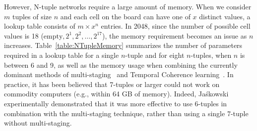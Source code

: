 However, N-tuple networks require a large amount of memory.
When we consider $m$ tuples of size $n$ and each cell on the board can have one of $x$ distinct values, a lookup table consists of $m \times x^n$ entries.
In 2048, since the number of possible cell values is 18 ($\mbox{empty}, 2^1, 2^2, \ldots, 2^{17}$), the memory requirement becomes an issue as $n$ increases.
Table~\ref{table:NTupleMemory} summarizes the number of parameters required in a lookup table for a single $n$-tuple and for eight $n$-tuples, when $n$ is between 6 and 9, as well as the memory usage when combining the currently dominant methods of multi-staging~\cite{YWHC16} and Temporal Coherence learning~\cite{Jask18}.
In practice, it has been believed that 7-tuples or larger could not work on commodity computers (e.g., within 64 GB of memory).
Indeed, Ja\'skowski~\cite{Jask18} experimentally demonstrated that it was more effective to use 6-tuples in combination with the multi-staging technique, rather than using a single 7-tuple without multi-staging.

